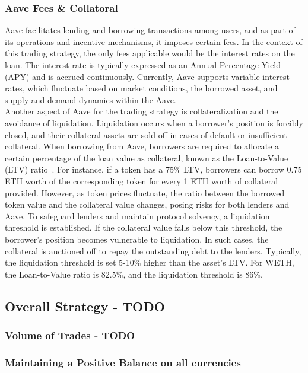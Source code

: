 \subsubsection{Aave Fees \& Collatoral}
Aave facilitates lending and borrowing transactions among users, and as part of its operations and incentive mechanisms, it imposes certain fees. In the context of this trading strategy, the only fees applicable would be the interest rates on the loan. The interest rate is typically expressed as an Annual Percentage Yield (APY) and is accrued continuously. Currently, Aave supports variable interest rates, which fluctuate based on market conditions, the borrowed asset, and supply and demand dynamics within the Aave.
\\[5mm]
Another aspect of Aave for the trading strategy is collateralization and the avoidance of liquidation. Liquidation occurs when a borrower's position is forcibly closed, and their collateral assets are sold off in cases of default or insufficient collateral. When borrowing from Aave, borrowers are required to allocate a certain percentage of the loan value as collateral, known as the Loan-to-Value (LTV) ratio~\cite{aave_risk}. For instance, if a token has a 75\% LTV, borrowers can borrow 0.75 ETH worth of the corresponding token for every 1 ETH worth of collateral provided. However, as token prices fluctuate, the ratio between the borrowed token value and the collateral value changes, posing risks for both lenders and Aave. To safeguard lenders and maintain protocol solvency, a liquidation threshold is established. If the collateral value falls below this threshold, the borrower's position becomes vulnerable to liquidation. In such cases, the collateral is auctioned off to repay the outstanding debt to the lenders. Typically, the liquidation threshold is set 5-10\% higher than the asset's LTV. For WETH, the Loan-to-Value ratio is 82.5\%, and the liquidation threshold is 86\%.

\subsection{Overall Strategy - TODO}

\subsubsection{Volume of Trades - TODO}
\subsubsection{Maintaining a Positive Balance on all currencies}

